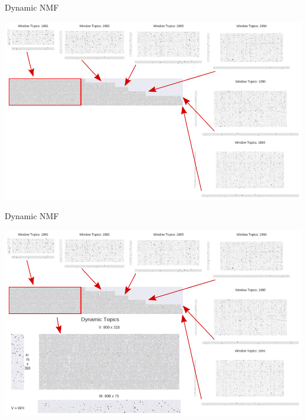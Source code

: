 \documentclass[9pt]{beamer}
\begin{document}
\begin{frame}[t]{Dynamic NMF}

\includegraphics[width=\linewidth]{../plots/sustainability/conceptual_annotated_1}

\end{frame}

\begin{frame}[t]{Dynamic NMF}

\includegraphics[width=\linewidth]{../plots/sustainability/conceptual_annotated_2}

\end{frame}



\end{document}
